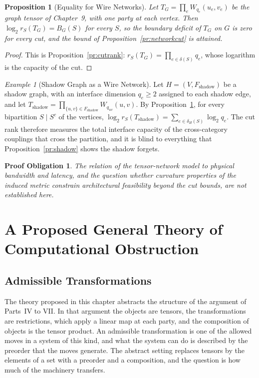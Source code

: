 \documentclass[11pt,letterpaper]{report}
\theoremstyle{plain}
\newtheorem{proposition}[theorem]{Proposition}
\newtheorem{obligation}[theorem]{Proof Obligation}
\theoremstyle{definition}
\theoremstyle{remark}
\newtheorem{example}[theorem]{Example}
\begin{document}
\begin{proposition}[Equality for Wire Networks]\label{pr:wireequality}
Let $T_G=\prod_{e}W_{q_e}(u_e,v_e)$ be the graph tensor of Chapter~9, with one party at each vertex. Then $\log_2r_S(T_G)=B_G(S)$ for every $S$, so the boundary deficit of $T_G$ on $G$ is zero for every cut, and the bound of Proposition~\ref{pr:networkcut} is attained.
\end{proposition}
\begin{proof}
This is Proposition~\ref{pr:cutrank}: $r_S(T_G)=\prod_{e\in\delta(S)}q_e$, whose logarithm is the capacity of the cut.
\end{proof}

\begin{example}[Shadow Graph as a Wire Network]\label{ex:shadownetwork}
Let $H=(V,F_{\mathrm{shadow}})$ be a shadow graph, with an interface dimension $q_e\ge2$ assigned to each shadow edge, and let $T_{\mathrm{shadow}}=\prod_{\{u,v\}\in F_{\mathrm{shadow}}}W_{q_{uv}}(u,v)$. By Proposition~\ref{pr:wireequality}, for every bipartition $S\mid S^c$ of the vertices, $\log_2r_S(T_{\mathrm{shadow}})=\sum_{e\in\delta_H(S)}\log_2q_e$. The cut rank therefore measures the total interface capacity of the cross-category couplings that cross the partition, and it is blind to everything that Proposition~\ref{pr:shadow} shows the shadow forgets.
\end{example}

\begin{obligation}\label{ob:architecture}
The relation of the tensor-network model to physical bandwidth and latency, and the question whether curvature properties of the induced metric constrain architectural feasibility beyond the cut bounds, are not established here.
\end{obligation}

\chapter{A Proposed General Theory of Computational Obstruction}

\section{Admissible Transformations}

The theory proposed in this chapter abstracts the structure of the argument of Parts~IV to VII. In that argument the objects are tensors, the transformations are restrictions, which apply a linear map at each party, and the composition of objects is the tensor product. An admissible transformation is one of the allowed moves in a system of this kind, and what the system can do is described by the preorder that the moves generate. The abstract setting replaces tensors by the elements of a set with a preorder and a composition, and the question is how much of the machinery transfers.
\end{document}
